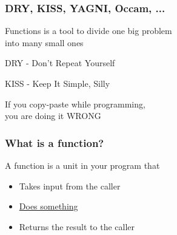 \documentclass[14pt,a4paper,dvipsnames,usenames]{beamer}
\begin{document}
\frame[plain]{\sectionpage}

\begin{frame}
  \frametitle{DRY, KISS, YAGNI, Occam, ...}

  Functions is a tool to divide one big problem\\into many small ones

  \vspace{1em}
  DRY - Don't Repeat Yourself

  \vspace{1em}
  KISS - Keep It Simple, 
   Silly

  \vspace{1em}
  If you copy-paste while programming,\\you are doing it {\color{Marty}WRONG}
  
\end{frame}

\begin{frame}
  \frametitle{What is a function?}

  A function is a unit in your program that

  \vspace{1em}
  \begin{itemize}
    \setlength\itemsep{1em}
    \item Takes input from the caller {\color{Tropiteal}\fontsize{8pt}{8pt}\selectfont[optional]}
    \item {\color{Marty}\underline{Does something}}
    \item Returns the result to the caller {\color{Tropiteal}\fontsize{8pt}{8pt}\selectfont[optional]}
  \end{itemize}
  
\end{frame}
\end{document}
